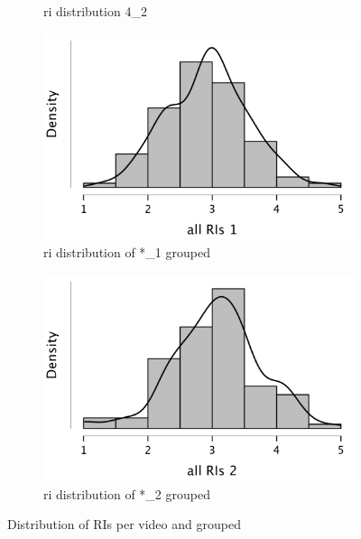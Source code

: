 \documentclass[
  a4paper,  %
  twoside,  %
  bibliography=totoc,
  headsepline,
  cleardoublepage=empty,
  parskip=half,
  draft=false
]{scrbook}
\begin{document}
\begin{figure}[h]
\begin{subfigure}{0.3\textwidth}
    \caption{\gls{ri} distribution 4\_2}
    \label{fig:RI42}
  \end{subfigure}
  \begin{subfigure}{0.45\textwidth}
    \includegraphics[width=\linewidth]{graphics/images/statistics/RIs/RI1_all.png}
    \caption{\gls{ri} distribution of *\_1 grouped}
    \label{fig:grouped-RI1}
  \end{subfigure}
  \begin{subfigure}{0.45\textwidth}
    \includegraphics[width=\linewidth]{graphics/images/statistics/RIs/RI2_all.png}
    \caption{\gls{ri} distribution of *\_2 grouped}
    \label{fig:grouped-RI2}
  \end{subfigure}
  \caption{Distribution of RIs per video and grouped}
  \label{fig:all-RIs}
\end{figure}
\end{document}

